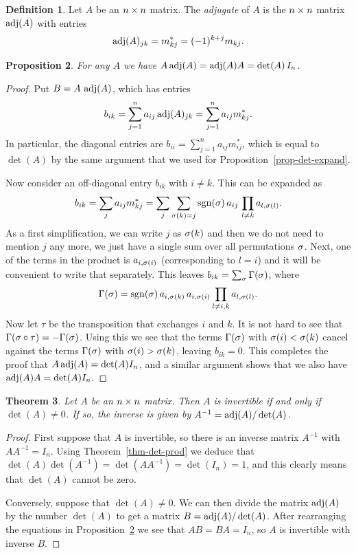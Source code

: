 \documentclass[reqno]{amsart}
\newtheorem{theorem}{Theorem}[section]
\newtheorem{proposition}[theorem]{Proposition}
\theoremstyle{definition}
\newtheorem{definition}[theorem]{Definition}
\newcommand{\dfn}[1]{\emph{{#1}}\index{#1}}
\begin{document}
\begin{definition}\label{defn-adjugate}
 Let $A$ be an $n\times n$ matrix.  The \dfn{adjugate} of $A$ is the
 $n\times n$ matrix $\operatorname{adj}(A)$ with entries
 \[ \operatorname{adj}(A)_{jk} = m^*_{kj} = (-1)^{k+j}m_{kj}. \]
\end{definition}

\begin{proposition}\label{prop-adjugate}
 For any $A$ we have $A\operatorname{adj}(A)=\operatorname{adj}(A)A=\det(A)\,I_n$.
\end{proposition}
\begin{proof}
 Put $B=A\,\operatorname{adj}(A)$, which has entries
 \[ b_{ik}=\sum_{j=1}^n a_{ij}\operatorname{adj}(A)_{jk}=\sum_{j=1}^na_{ij}m^*_{kj}. \]
 In particular, the diagonal entries are
 $b_{ii}=\sum_{j=1}^na_{ij}m^*_{ij}$, which is equal to $\det(A)$ by
 the same argument that we used for Proposition~\ref{prop-det-expand}.

 Now consider an off-diagonal entry $b_{ik}$ with $i\neq k$.  This can
 be expanded as
 \[ b_{ik} = \sum_j a_{ij}m^*_{kj} =
     \sum_j \sum_{\sigma(k)=j} \operatorname{sgn}(\sigma)\,a_{ij}\, \prod_{l\neq k} a_{l,\sigma(l)}.
 \]
 As a first simplification, we can write $j$ as $\sigma(k)$ and then we
 do not need to mention $j$ any more, we just have a single sum over
 all permutations $\sigma$.  Next, one of the terms in the product is
 $a_{i,\sigma(i)}$ (corresponding to $l=i$) and it will be convenient to
 write that separately.  This leaves $b_{ik}=\sum_\sigma\Gamma(\sigma)$, where
 \[ \Gamma(\sigma) =  \operatorname{sgn}(\sigma)\,a_{i,\sigma(k)}\,a_{i,\sigma(i)}
      \prod_{l\neq i,k} a_{l,\sigma(l)}.
 \]
 Now let $\tau$ be the transposition that exchanges $i$ and $k$.   It
 is not hard to see that $\Gamma(\sigma\circ\tau)=-\Gamma(\sigma)$.  Using this we
 see that the terms $\Gamma(\sigma)$ with $\sigma(i)<\sigma(k)$ cancel against the
 terms $\Gamma(\sigma)$ with $\sigma(i)>\sigma(k)$, leaving $b_{ik}=0$.  This
 completes the proof that $A\operatorname{adj}(A)=\det(A) I_n$, and a similar
 argument shows that we also have $\operatorname{adj}(A)A=\det(A)I_n$.
\end{proof}

\begin{theorem}\label{thm-inv-det}
 Let $A$ be an $n\times n$ matrix.  Then $A$ is invertible if and only if
 $\det(A)\neq 0$.  If so, the inverse is given by
 $A^{-1}=\operatorname{adj}(A)/\det(A)$.
\end{theorem}
\begin{proof}
 First suppose that $A$ is invertible, so there is an inverse matrix
 $A^{-1}$ with $AA^{-1}=I_n$.  Using Theorem~\ref{thm-det-prod} we
 deduce that $\det(A)\det(A^{-1})=\det(AA^{-1})=\det(I_n)=1$, and this
 clearly means that $\det(A)$ cannot be zero.

 Conversely, suppose that $\det(A)\neq 0$.  We can then divide the
 matrix $\operatorname{adj}(A)$ by the number $\det(A)$ to get a matrix
 $B=\operatorname{adj}(A)/\det(A)$.  After rearranging the equations in
 Proposition~\ref{prop-adjugate} we see that $AB=BA=I_n$, so $A$ is
 invertible with inverse $B$.
\end{proof}


 
\end{document}
